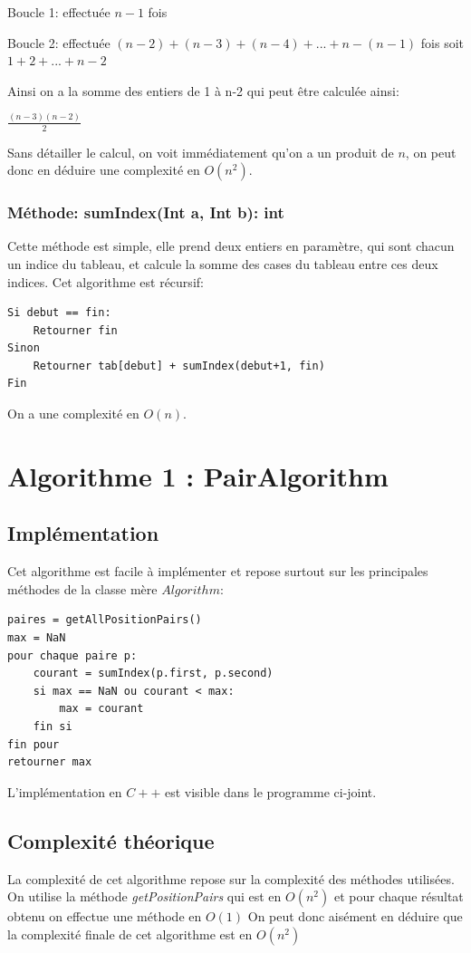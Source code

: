 \documentclass[a4paper, 12pt]{article}
\begin{document}
Boucle 1: effectuée $n-1$ fois

Boucle 2: effectuée $(n-2) + (n-3) + (n-4) + ... + n-(n-1)$ fois
soit $1 + 2 + ... + n-2$

Ainsi on a la somme des entiers de 1 à n-2 qui peut être calculée ainsi:

\begin {center}
$\frac{(n-3)(n-2)}{2}$
\end{center}

Sans détailler le calcul, on voit immédiatement qu'on a un produit de $n$, on peut donc en déduire une complexité en $O(n^2)$.

\subsubsection{Méthode: sumIndex(Int a, Int b): int}
Cette méthode est simple, elle prend deux entiers en paramètre, qui sont chacun un indice du tableau, et calcule la somme des cases du tableau entre ces deux indices. Cet algorithme est récursif:
\begin{verbatim}
Si debut == fin:
    Retourner fin
Sinon 
    Retourner tab[debut] + sumIndex(debut+1, fin)
Fin
\end{verbatim}
On a une complexité en $O(n)$.
\section{Algorithme 1 : PairAlgorithm}
\subsection{Implémentation}
Cet algorithme est facile à implémenter et repose surtout sur les principales méthodes de la classe mère $Algorithm$:
\begin{verbatim}
paires = getAllPositionPairs()
max = NaN
pour chaque paire p:
    courant = sumIndex(p.first, p.second)
    si max == NaN ou courant < max:
        max = courant
    fin si
fin pour
retourner max
\end{verbatim}
L'implémentation en $C++$ est visible dans le programme ci-joint.
\subsection{Complexité théorique}
La complexité de cet algorithme repose sur la complexité des méthodes utilisées. 
On utilise la méthode \emph{getPositionPairs} qui est en $O(n^2)$ et pour chaque résultat obtenu on effectue une méthode en $O(1)$  
On peut donc aisément en déduire que la complexité finale de cet algorithme est en $O(n^2)$
\end{document}

